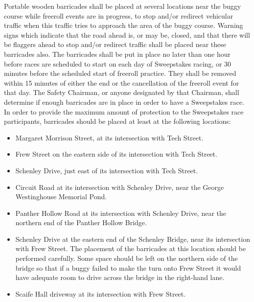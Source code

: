 	Portable wooden barricades shall be placed at several locations near the buggy 
	course while freeroll events are in progress, to stop and/or redirect
	vehicular traffic when this traffic tries to approach the area of the buggy
	course. Warning signs which indicate that the road ahead is, or may be, closed,
	and that there will be flaggers ahead to stop and/or redirect traffic shall be
	placed near these barricades also. The barricades shall be put in place no
	later than one hour before races are scheduled to start on each day of
	Sweepstakes racing, or 30 minutes before the scheduled start of freeroll 
	practice. They shall be removed within 15 minutes of either the end or the 
	cancellation of the freeroll event for that day. The
	Safety Chairman, or anyone designated by that Chairman, shall determine if
	enough barricades are in place in order to have a Sweepstakes race. In order to
	provide the maximum amount of protection to the Sweepstakes race participants,
	barricades should be placed at least at the following locations:

	\begin{itemize}

		\item Margaret Morrison Street, at its intersection with Tech Street.

		\item Frew Street on the eastern side of its intersection with Tech
		Street.

		\item Schenley Drive, just east of its intersection with Tech Street.

		\item Circuit Road at its intersection with Schenley Drive, near the
		George Westinghouse Memorial Pond.

		\item Panther Hollow Road at its intersection with Schenley Drive, near
		the northern end of the Panther Hollow Bridge.

		\item Schenley Drive at the eastern end of the Schenley Bridge, near its
		intersection with Frew Street. The placement of the barricades at this location
		should be performed carefully. Some space should be left on the northern side
		of the bridge so that if a buggy failed to make the turn onto Frew Street it
		would have adequate room to drive across the bridge in the right-hand lane.

		\item Scaife Hall driveway at its intersection with Frew Street.

	\end{itemize}

